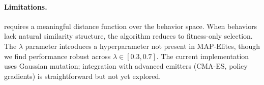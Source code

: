 \paragraph{Limitations.}
\mmr requires a meaningful distance function over the behavior space.
When behaviors lack natural similarity structure, the algorithm reduces to fitness-only selection.
The $\lambda$ parameter introduces a hyperparameter not present in MAP-Elites, though we find performance robust across $\lambda \in [0.3, 0.7]$.
The current implementation uses Gaussian mutation; integration with advanced emitters (CMA-ES, policy gradients) is straightforward but not yet explored.
